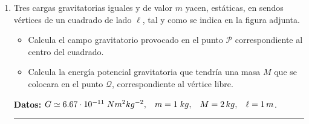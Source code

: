 \documentclass[a4paper,14pt]{exam}
\newcommand{\halmos}{\vspace*{-7mm}
	
					\begin{flushright}
						\rule{1mm}{2.5mm} 
					\end{flushright}\vspace*{-6mm}
						
					  }
\renewcommand{\qed}{\halmos}
\begin{document}
\begin{enumerate}
	
	

			\item Tres cargas gravitatorias iguales y de valor $m$ yacen, estáticas, en sendos vértices de un cuadrado de lado $\ell$, tal y como se indica en la figura adjunta. 
	
 		\begin{minipage}{.7\linewidth}
 		\begin{itemize}
			\item[a)] Calcula el campo gravitatorio provocado en el punto $\mathcal{P}$ correspondiente al centro del cuadrado.
			\item[b)] Calcula la energía potencial gravitatoria que tendría una masa $M$ que se colocara en el punto $\mathcal{Q}$, correspondiente al vértice libre.
			\vspace{.1ex}
						
		\end{itemize}
 		\end{minipage}\hfill
 		\begin{minipage}{.3\linewidth}
 		\raggedleft
 			\def\svgwidth{.85\linewidth}
			
 		\end{minipage}
 		\begin{small}
				
			\textbf{Datos:} $G\simeq 6.67\cdot 10^{-11}\;Nm^2kg^{-2},\hspace{3mm}m=1\;kg,\hspace{3mm}M=2\,kg,\hspace{3mm}\ell=1\,m$.
			\end{small}
			
		\qed
	
		
\end{enumerate}		
 
\end{document}
